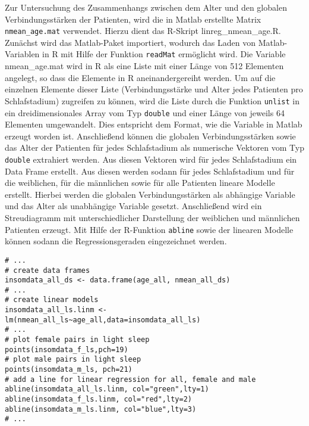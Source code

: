 Zur Untersuchung des Zusammenhangs zwischen dem Alter und den globalen Verbindungsstärken der Patienten, wird die in Matlab erstellte Matrix \texttt{nmean\_age.mat} verwendet. Hierzu dient das R-Skript linreg\_nmean\_age.R. Zunächst wird das Matlab-Paket importiert, wodurch das Laden von Matlab-Variablen in R mit Hilfe der Funktion \texttt{readMat} ermöglicht wird. Die Variable nmean\_age.mat wird in R als eine Liste mit einer Länge von 512 Elementen angelegt, so dass die Elemente in R aneinandergereiht werden. Um auf die einzelnen Elemente dieser Liste (Verbindungsstärke und Alter jedes Patienten pro Schlafstadium) zugreifen zu können, wird die Liste durch die Funktion \texttt{unlist} in ein dreidimensionales Array vom Typ \texttt{double} und einer Länge von jeweils 64 Elementen umgewandelt. Dies entspricht dem Format, wie die Variable in Matlab erzeugt worden ist. Anschließend können die globalen Verbindungsstärken sowie das Alter der Patienten für jedes Schlafstadium als numerische Vektoren vom Typ \texttt{double} extrahiert werden. Aus diesen Vektoren wird für jedes Schlafstadium ein Data Frame erstellt. Aus diesen werden sodann für jedes Schlafstadium und für die weiblichen, für die männlichen sowie für alle Patienten lineare Modelle erstellt. Hierbei werden die globalen Verbindungsstärken als abhängige Variable und das Alter als unabhängige Variable gesetzt. Anschließend wird ein Streudiagramm mit unterschiedlicher Darstellung der weiblichen und männlichen Patienten erzeugt. Mit Hilfe der R-Funktion \texttt{abline} sowie der linearen Modelle können sodann die Regressionsgeraden eingezeichnet werden.\\

\begin{lstlisting}[caption={Erstellung eines Streudiagramms und Einzeichnung der Regressionslinien in dem Skript linreg\_nmean\_age.R}, label={lst:nmean_age}]
# ...
# create data frames
insomdata_all_ds <- data.frame(age_all, nmean_all_ds)
# ...
# create linear models
insomdata_all_ls.linm <- lm(nmean_all_ls~age_all,data=insomdata_all_ls)
# ...
# plot female pairs in light sleep
points(insomdata_f_ls,pch=19)
# plot male pairs in light sleep
points(insomdata_m_ls, pch=21)
# add a line for linear regression for all, female and male 
abline(insomdata_all_ls.linm, col="green",lty=1)
abline(insomdata_f_ls.linm, col="red",lty=2)
abline(insomdata_m_ls.linm, col="blue",lty=3)
# ...
\end{lstlisting}

